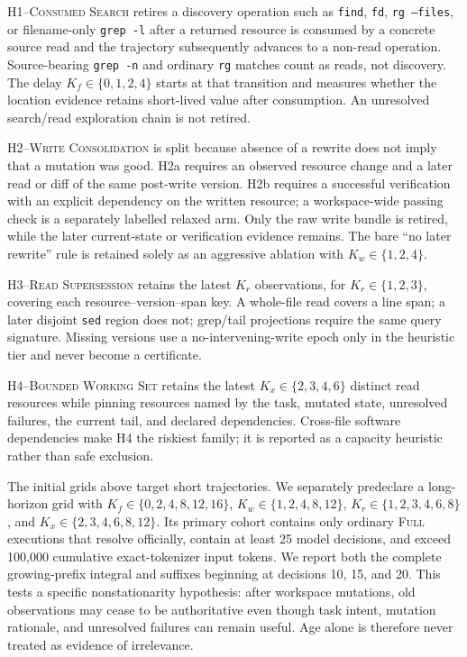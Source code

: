 \documentclass[11pt]{article}
\begin{document}
\textsc{H1--Consumed Search} retires a discovery operation such as
\texttt{find}, \texttt{fd}, \texttt{rg --files}, or filename-only
\texttt{grep -l} after a returned resource is consumed by a concrete source
read and the trajectory subsequently advances to a non-read operation.
Source-bearing \texttt{grep -n} and ordinary \texttt{rg} matches count as
reads, not discovery. The delay $K_f\in\{0,1,2,4\}$ starts at that transition
and measures whether the location evidence retains short-lived value after
consumption. An unresolved search/read exploration chain is not retired.

\textsc{H2--Write Consolidation} is split because absence of a rewrite does
not imply that a mutation was good. H2a requires an observed resource change
and a later read or diff of the same post-write version. H2b requires a
successful verification with an explicit dependency on the written resource;
a workspace-wide passing check is a separately labelled relaxed arm. Only the
raw write bundle is retired, while the later current-state or verification
evidence remains. The bare ``no later rewrite'' rule is retained solely as an
aggressive ablation with $K_w\in\{1,2,4\}$.

\textsc{H3--Read Supersession} retains the latest $K_r$ observations, for
$K_r\in\{1,2,3\}$, covering each resource--version--span key. A whole-file
read covers a line span; a later disjoint \texttt{sed} region does not;
grep/tail projections require the same query signature. Missing versions use a
no-intervening-write epoch only in the heuristic tier and never become a
certificate.

\textsc{H4--Bounded Working Set} retains the latest
$K_x\in\{2,3,4,6\}$ distinct read resources while pinning resources named by
the task, mutated state, unresolved failures, the current tail, and declared
dependencies. Cross-file software dependencies make H4 the riskiest family;
it is reported as a capacity heuristic rather than safe exclusion.

The initial grids above target short trajectories.  We separately predeclare
a long-horizon grid with $K_f\in\{0,2,4,8,12,16\}$,
$K_w\in\{1,2,4,8,12\}$, $K_r\in\{1,2,3,4,6,8\}$, and
$K_x\in\{2,3,4,6,8,12\}$.  Its primary cohort contains only ordinary
\textsc{Full} executions that resolve officially, contain at least 25 model
decisions, and exceed 100,000 cumulative exact-tokenizer input tokens.  We
report both the complete growing-prefix integral and suffixes beginning at
decisions 10, 15, and 20.  This tests a specific nonstationarity hypothesis:
after workspace mutations, old observations may cease to be authoritative
even though task intent, mutation rationale, and unresolved failures can
remain useful.  Age alone is therefore never treated as evidence of
irrelevance.
\end{document}
